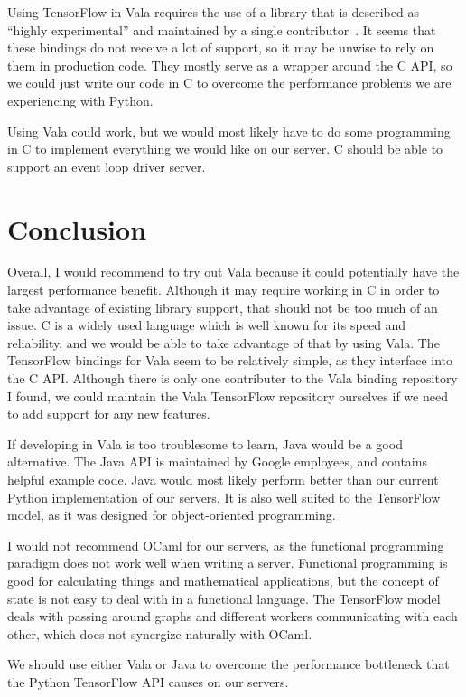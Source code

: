 \documentclass[letterpaper,twocolumn,10pt]{article}
\begin{document}
Using TensorFlow in Vala requires the use of a library that is described as ``highly experimental'' and maintained by a single contributor~\cite{valatensor}.
It seems that these bindings do not receive a lot of support, so it may be unwise to rely on them in production code. They mostly serve as a wrapper
around the C API, so we could just write our code in C to overcome the performance problems we are experiencing with Python.

Using Vala could work, but we would most likely have to do some programming in C to implement everything we would like on our server. C should
be able to support an event loop driver server.

\section{Conclusion}

Overall, I would recommend to try out Vala because it could potentially have the largest performance benefit. Although it may require working in
C in order to take advantage of existing library support, that should not be too much of an issue. C is a widely used language which is well
known for its speed and reliability, and we would be able to take advantage of that by using Vala. The TensorFlow bindings for Vala
seem to be relatively simple, as they interface into the C API. Although there is only one contributer to the Vala binding repository I found,
we could maintain the Vala TensorFlow repository ourselves if we need to add support for any new features.

If developing in Vala is too troublesome to learn, Java would be a good alternative. The Java API is maintained by Google employees, and contains
helpful example code. Java would most likely perform better than our current Python implementation of our servers. It is also well suited to the
TensorFlow model, as it was designed for object-oriented programming.

I would not recommend OCaml for our servers, as the functional programming paradigm does not work well when writing a server. Functional programming
is good for calculating things and mathematical applications, but the concept of state is not easy to deal with in a functional language. The
TensorFlow model deals with passing around graphs and different workers communicating with each other, which does not synergize naturally with OCaml.

We should use either Vala or Java to overcome the performance bottleneck that the Python TensorFlow API causes on our servers.
\end{document}
